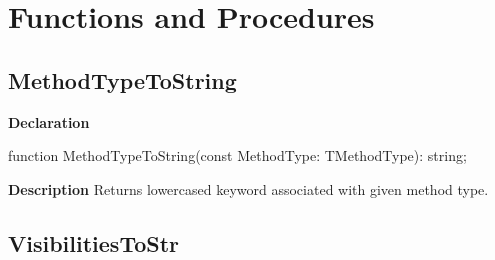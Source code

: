 \documentclass{report}
\newif\ifpdf
\begin{document}
\section{Functions and Procedures}
\ifpdf
\subsection*{\large{\textbf{MethodTypeToString}}\normalsize\hspace{1ex}\hrulefill}
\else
\subsection*{MethodTypeToString}
\fi
\label{PasDoc_Items-MethodTypeToString}
\begin{list}{}{
\setlength{\itemindent}{0cm}
\setlength{\listparindent}{0cm}
\setlength{\leftmargin}{\evensidemargin}
\addtolength{\leftmargin}{\tmplength}
\settowidth{\labelsep}{X}
\addtolength{\leftmargin}{\labelsep}
\setlength{\labelwidth}{\tmplength}
}
\item[\textbf{Declaration}\hfill]
\ifpdf
\begin{flushleft}
\fi
\begin{ttfamily}
function MethodTypeToString(const MethodType: TMethodType): string;\end{ttfamily}

\ifpdf
\end{flushleft}
\fi

\par
\item[\textbf{Description}]
Returns lowercased keyword associated with given method type.

\end{list}
\ifpdf
\subsection*{\large{\textbf{VisibilitiesToStr}}\normalsize\hspace{1ex}\hrulefill}
\else
\end{document}
